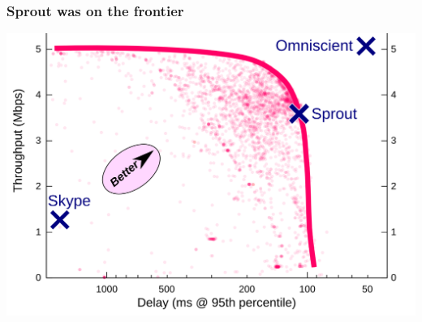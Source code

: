 \documentclass[svgnames]{beamer}
\begin{document}
\begin{frame}
\frametitle{Sprout was on the frontier}

\begin{centering}
\includegraphics[width=0.9\columnwidth]{pointplot-withhull.png}

\end{centering}

\end{frame}
\end{document}
